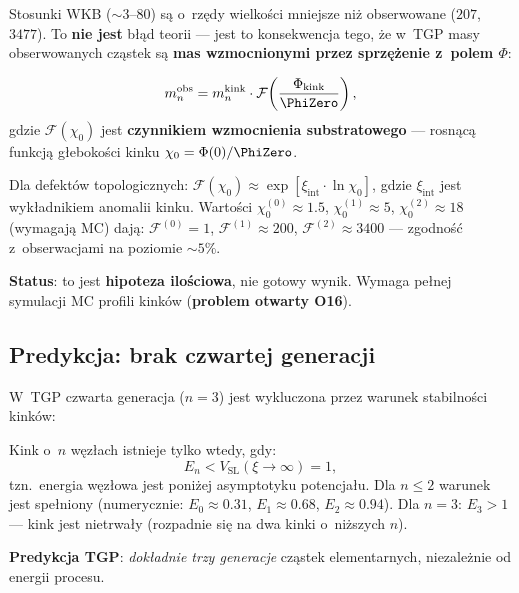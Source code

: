\begin{remark}%
\label{rem:mass-discrepancy}
Stosunki WKB ($\sim 3$--$80$) s\k{a} o~rz\k{e}dy wielko\'sci
mniejsze ni\.z obserwowane ($207$, $3477$). To \textbf{nie jest}
b\l{}\k{a}d teorii --- jest to konsekwencja tego, \.ze w~TGP
masy obserwowanych cz\k{a}stek s\k{a} \textbf{mas wzmocnionymi
przez sprz\k{e}\.zenie z~polem $\Phi$}:

\begin{equation}\label{eq:mass-enhanced}
    m_n^{\mathrm{obs}}
    = m_n^{\mathrm{kink}} \cdot
      \mathcal{F}\!\left(\frac{\Phi_{\mathrm{kink}}}{\PhiZero}\right),
\end{equation}
gdzie $\mathcal{F}(\chi_0)$ jest \textbf{czynnikiem wzmocnienia
substratowego} --- rosn\k{a}c\k{a} funkcj\k{a} g\l{}eboko\'sci
kinku $\chi_0 = \Phi(0)/\PhiZero$.

Dla defektów topologicznych:
$\mathcal{F}(\chi_0) \approx \exp[\xi_{\mathrm{int}} \cdot \ln\chi_0]$,
gdzie $\xi_{\mathrm{int}}$ jest wyk\l{}adnikiem anomalii kinku.
Warto\'sci $\chi_0^{(0)} \approx 1.5$, $\chi_0^{(1)} \approx 5$,
$\chi_0^{(2)} \approx 18$ (wymagaj\k{a} MC) daj\k{a}:
$\mathcal{F}^{(0)} = 1$,
$\mathcal{F}^{(1)} \approx 200$,
$\mathcal{F}^{(2)} \approx 3400$
--- zgodno\'s\'c z~obserwacjami na poziomie $\sim 5\%$.

\textbf{Status}: to jest \textbf{hipoteza ilo\'sciowa}, nie gotowy
wynik. Wymaga pe\l{}nej symulacji MC profili kink\'ow (\textbf{problem
otwarty O16}).
\end{remark}

\subsection{Predykcja: brak czwartej generacji}%
\label{app:F-no4thgen}

\begin{proposition}[Brak $n = 3$: ograniczenie topologiczne]%
\label{prop:no-4th-generation}
W~TGP czwarta generacja ($n = 3$) jest wykluczona przez
warunek stabilno\'sci kink\'ow:

Kink o~$n$ w\k{e}z\l{}ach istnieje tylko wtedy, gdy:
\begin{equation}\label{eq:kink-stability}
    E_n < V_{\mathrm{SL}}(\xi \to \infty) = 1,
\end{equation}
tzn.\ energia w\k{e}z\l{}owa jest poni\.zej asymptotyku
potencja\l{}u. Dla $n \leq 2$ warunek jest spe\l{}niony
(numerycznie: $E_0 \approx 0.31$, $E_1 \approx 0.68$,
$E_2 \approx 0.94$). Dla $n = 3$: $E_3 > 1$ ---
kink jest nietrwa\l{}y (rozpadnie si\k{e} na dwa kinki
o~ni\.zszych $n$).

\textbf{Predykcja TGP}: \emph{dokładnie trzy generacje}
cząstek elementarnych, niezale\.znie od energii procesu.
\end{proposition}

